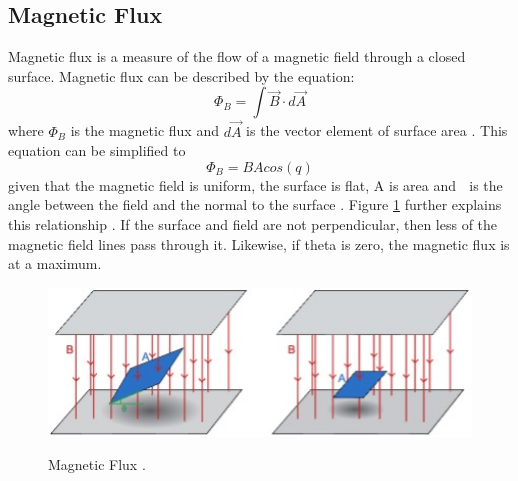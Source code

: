 \subsection{Magnetic Flux}
Magnetic flux is a measure of the flow of a magnetic field through a closed surface. Magnetic flux can be described 
by the equation:
\begin{equation}
    \Phi_B = \int{\vec{B} \cdot d\vec{A}}
\end{equation}
where $\Phi_B$ is the magnetic flux and $d\vec{A}$ is the vector element of surface area \cite{young_university_2016}. 
This equation can be simplified to 
\begin{equation}
    \Phi_B = BA cos(q)
\end{equation}
given that the magnetic field is uniform, the surface is flat, A is area and  is the angle between the field and 
the normal to the surface \cite{young_university_2016}. Figure \ref{fig: f1} further explains this relationship 
\cite{young_university_2016}. If the surface and field are not perpendicular, then less of the magnetic field lines 
pass through it. Likewise, if theta is zero, the magnetic flux is at a maximum.  

\begin{figure}
    \begin{center}
    \includegraphics[width=5in]{fig1.jpg}
    \end{center}
    \renewcommand{\baselinestretch}{1}
    \small\normalsize
    \begin{quote}
    \caption[Magnetic Flux]{Magnetic Flux \cite{noauthor_what_nodate}.} \label{fig: f1}
    \end{quote}
\end{figure}


